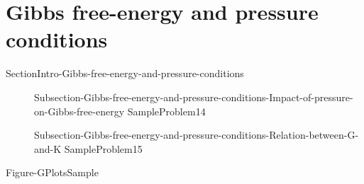 \documentclass[main.tex]{subfiles}
\begin{document}
\section{Gibbs free-energy and pressure conditions}{SectionIntro-Gibbs-free-energy-and-pressure-conditions}
\sloppy\begin{description}
\item[] {Subsection-Gibbs-free-energy-and-pressure-conditions-Impact-of-pressure-on-Gibbs-free-energy}
{SampleProblem14}
\item[] {Subsection-Gibbs-free-energy-and-pressure-conditions-Relation-between-G-and-K}
{SampleProblem15}
\end{description}


 
\hspace{4cm} \begin{center}{Figure-GPlotsSample}\end{center}
\begin{marginfigure}[-8cm]\usetikzlibrary {shapes.symbols}\end{marginfigure}
\end{document}
